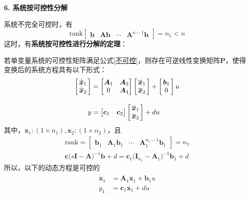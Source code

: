 \noindent \textbf{6. 系统按可控性分解}

系统不完全可控时，有
\begin{equation}
	\text{rank}
	\begin{bmatrix}
		\bm{b} & \bm{Ab} & \cdots & \bm{A}^{n-1}\bm{b}
	\end{bmatrix}
	= n_1 < n
	\label{不可控}
\end{equation}
这时，有\textbf{系统按可控性进行分解的定理}：

若单变量系统的可控性矩阵满足公式\eqref{不可控}，则存在可逆线性变换矩阵$\bm{P}$，使得变换后的系统方程具有以下形式：
\begin{align}
	\begin{bmatrix}
		\hspace*{0.5mm}\dot{\overline{\bm{x}}}_1 \hspace*{0.5mm}\\
		\dot{\overline{\bm{x}}}_2 \\
	\end{bmatrix}
	&=
	\begin{bmatrix}
		\bm{A}_1 & \bm{A}_2\\
		0 & \bm{A}_4
	\end{bmatrix}
	\begin{bmatrix}
		\hspace*{0.5mm}\overline{\bm{x}}_1 \hspace*{0.5mm}\\
		\overline{\bm{x}}_2 \\
	\end{bmatrix}
	+
	\begin{bmatrix}
	\hspace*{0.5mm}	\bm{b}_1 \hspace*{0.5mm}\\
		0
	\end{bmatrix}u \\[1em]
	y &= 
	\begin{bmatrix}
		\bm{c}_1 & \bm{c}_2 
	\end{bmatrix}
	\begin{bmatrix}
		\hspace*{0.5mm}\overline{\bm{x}}_1 \hspace*{0.5mm}\\
		\overline{\bm{x}}_2 \\
	\end{bmatrix}
	+ du
	\label{传递函数不变}
\end{align}
其中，$\overline{\bm{x}}_1:(1 \times n_1),\overline{\bm{x}}_2:(1 \times n_2)$，且
\begin{align}
	\text{rank} = 
	\begin{bmatrix}
		\bm{b}_1 & \bm{A}_1\bm{b}_1 & \cdots & \bm{A}_1^{n_1-1}\bm{b}_1
	\end{bmatrix}
	= n_1\\[0.5em]
	\bm{c}\big(s\bm{I}-\bm{A}\big)^{-1}\bm{b} + d = \bm{c}_1 \big(\bm{I}_{n_1} - \bm{A}_1\big)^{-1}\bm{b}_1 + d
\end{align}
所以，以下的动态方程是可控的
\begin{align}
	\dot{\overline{\bm{x}}}_1 &= \bm{A}_1 \overline{\bm{x}}_1 + \bm{b}_1 u\\
	y_1 & = \bm{c}_1 \overline{\bm{x}}_1 + du
\end{align}

